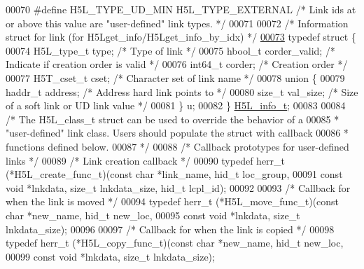 \begin{DoxyCode}
00070 \textcolor{preprocessor}{#define H5L\_TYPE\_UD\_MIN      H5L\_TYPE\_EXTERNAL  }\textcolor{comment}{/* Link ids at or above this value are "user-defined" link
       types. */}\textcolor{preprocessor}{}
00071 
00072 \textcolor{comment}{/* Information struct for link (for H5Lget\_info/H5Lget\_info\_by\_idx) */}
\hyperlink{struct_h5_l__info__t}{00073} \textcolor{keyword}{typedef} \textcolor{keyword}{struct }\{
00074     H5L\_type\_t          type;           \textcolor{comment}{/* Type of link                   */}
00075     hbool\_t             corder\_valid;   \textcolor{comment}{/* Indicate if creation order is valid */}
00076     int64\_t             corder;         \textcolor{comment}{/* Creation order                 */}
00077     H5T\_cset\_t          cset;           \textcolor{comment}{/* Character set of link name     */}
00078     \textcolor{keyword}{union }\{
00079         haddr\_t         address;        \textcolor{comment}{/* Address hard link points to    */}
00080         \textcolor{keywordtype}{size\_t}          val\_size;       \textcolor{comment}{/* Size of a soft link or UD link value */}
00081     \} u;
00082 \} \hyperlink{struct_h5_l__info__t}{H5L\_info\_t};
00083 
00084 \textcolor{comment}{/* The H5L\_class\_t struct can be used to override the behavior of a}
00085 \textcolor{comment}{ * "user-defined" link class. Users should populate the struct with callback}
00086 \textcolor{comment}{ * functions defined below.}
00087 \textcolor{comment}{ */}
00088 \textcolor{comment}{/* Callback prototypes for user-defined links */}
00089 \textcolor{comment}{/* Link creation callback */}
00090 \textcolor{keyword}{typedef} herr\_t (*H5L\_create\_func\_t)(\textcolor{keyword}{const} \textcolor{keywordtype}{char} *link\_name, hid\_t loc\_group,
00091     \textcolor{keyword}{const} \textcolor{keywordtype}{void} *lnkdata, \textcolor{keywordtype}{size\_t} lnkdata\_size, hid\_t lcpl\_id);
00092 
00093 \textcolor{comment}{/* Callback for when the link is moved */}
00094 \textcolor{keyword}{typedef} herr\_t (*H5L\_move\_func\_t)(\textcolor{keyword}{const} \textcolor{keywordtype}{char} *new\_name, hid\_t new\_loc,
00095     \textcolor{keyword}{const} \textcolor{keywordtype}{void} *lnkdata, \textcolor{keywordtype}{size\_t} lnkdata\_size);
00096 
00097 \textcolor{comment}{/* Callback for when the link is copied */}
00098 \textcolor{keyword}{typedef} herr\_t (*H5L\_copy\_func\_t)(\textcolor{keyword}{const} \textcolor{keywordtype}{char} *new\_name, hid\_t new\_loc,
00099     \textcolor{keyword}{const} \textcolor{keywordtype}{void} *lnkdata, \textcolor{keywordtype}{size\_t} lnkdata\_size);

\end{DoxyCode}
